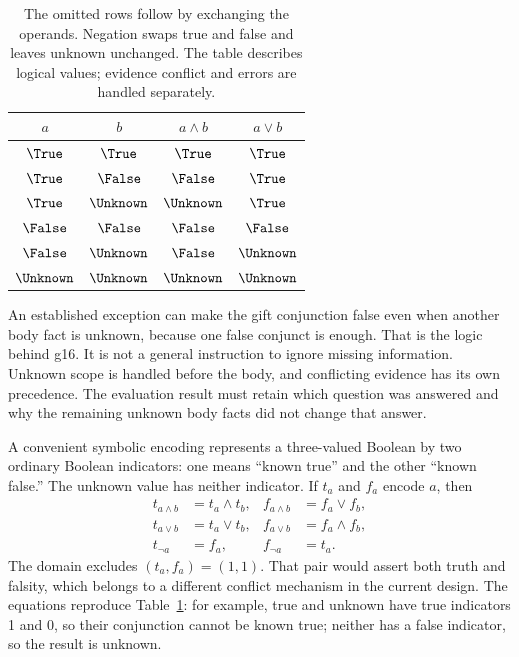 \begin{table}[htbp]
\centering
\begin{tabular}{cc|cc}
\toprule
$a$ & $b$ & $a\land b$ & $a\lor b$\\
\midrule
$\True$ & $\True$ & $\True$ & $\True$\\
$\True$ & $\False$ & $\False$ & $\True$\\
$\True$ & $\Unknown$ & $\Unknown$ & $\True$\\
$\False$ & $\False$ & $\False$ & $\False$\\
$\False$ & $\Unknown$ & $\False$ & $\Unknown$\\
$\Unknown$ & $\Unknown$ & $\Unknown$ & $\Unknown$\\
\bottomrule
\end{tabular}
\caption{The omitted rows follow by exchanging the operands. Negation swaps
true and false and leaves unknown unchanged. The table describes logical values;
evidence conflict and errors are handled separately.}
\label{tab:kleene}
\end{table}

An established exception can make the gift conjunction false even when another
body fact is unknown, because one false conjunct is enough. That is the logic
behind g16. It is not a general instruction to ignore missing information.
Unknown scope is handled before the body, and conflicting evidence has its own
precedence. The evaluation result must retain which question was answered and
why the remaining unknown body facts did not change that answer.


A convenient symbolic encoding represents a three-valued Boolean by two ordinary
Boolean indicators: one means ``known true'' and the other ``known false.'' The
unknown value has neither indicator. If $t_a$ and $f_a$ encode $a$, then
\begin{align}
 t_{a\land b}&=t_a\land t_b,& f_{a\land b}&=f_a\lor f_b,\label{eq:kleene-and}\\
 t_{a\lor b}&=t_a\lor t_b,& f_{a\lor b}&=f_a\land f_b,\label{eq:kleene-or}\\
 t_{\neg a}&=f_a,& f_{\neg a}&=t_a.\label{eq:kleene-not}
\end{align}
The domain excludes $(t_a,f_a)=(1,1)$. That pair would assert both truth and
falsity, which belongs to a different conflict mechanism in the current design.
The equations reproduce Table~\ref{tab:kleene}: for example, true and unknown
have true indicators 1 and 0, so their conjunction cannot be known true; neither
has a false indicator, so the result is unknown.


